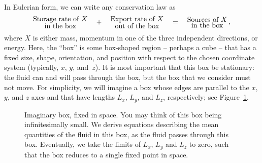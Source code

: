 \documentclass[12pt]{article}
\begin{document}
In Eulerian form, we can write any conservation law as
\begin{gather}
\substack{\text{\normalsize Storage rate of $X$}\\\text{\normalsize in the box}} \quad + \quad \substack{\text{\normalsize Export rate of $X$}\\\text{\normalsize out of the box}} \quad = \quad \substack{\text{\normalsize Sources of $X$}\\\text{\normalsize in the box}} \, , \label{conservation}
\end{gather}
where $X$ is either mass, momentum in one of the three independent directions, or energy.  Here, the ``box'' is some box-shaped region -- perhaps a cube -- that has a fixed size, shape, orientation, and position with respect to the chosen coordinate system (typically, $x$, $y$, and~$z$).  It is most important that this box be stationary: the fluid can and will pass through the box, but the box that we consider must not move.  For simplicity, we will imagine a box whose edges are parallel to the $x$, $y$, and $z$ axes and that have lengths $L_x$, $L_y$, and $L_z$, respectively; see Figure~\ref{imaginary_box}.


\begin{figure}[b]
\begin{center}
\caption{Imaginary box, fixed in space. You may think of this box being infinitesimally small.  We derive equations describing the mean quantities of the fluid in this box, as the fluid passes through this box. Eventually, we take the limits of $L_x$, $L_y$ and $L_z$ to zero, such that the box reduces to a single fixed point in space.}
\label{imaginary_box}
\end{center}
\end{figure}
\end{document}
